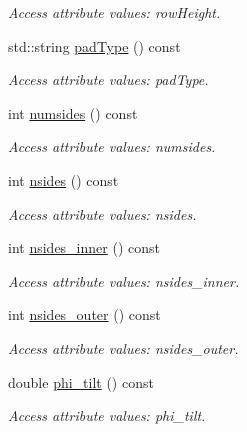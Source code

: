 \begin{DoxyCompactItemize}
\begin{DoxyCompactList}\small\item\em Access attribute values: rowHeight. \item\end{DoxyCompactList}\item 
std::string \hyperlink{struct_d_d4hep_1_1_x_m_l_1_1_dimension_ad410c2fa6dc3cd8edb60072a51bd3b38}{padType} () const 
\begin{DoxyCompactList}\small\item\em Access attribute values: padType. \item\end{DoxyCompactList}\item 
int \hyperlink{struct_d_d4hep_1_1_x_m_l_1_1_dimension_aad36bdbceb76c40112a9ae371d3405ad}{numsides} () const 
\begin{DoxyCompactList}\small\item\em Access attribute values: numsides. \item\end{DoxyCompactList}\item 
int \hyperlink{struct_d_d4hep_1_1_x_m_l_1_1_dimension_a2d8b7827cdd126398a07c81937f307e9}{nsides} () const 
\begin{DoxyCompactList}\small\item\em Access attribute values: nsides. \item\end{DoxyCompactList}\item 
int \hyperlink{struct_d_d4hep_1_1_x_m_l_1_1_dimension_aeef195971d2d39f221ad5e292e253fc4}{nsides\_\-inner} () const 
\begin{DoxyCompactList}\small\item\em Access attribute values: nsides\_\-inner. \item\end{DoxyCompactList}\item 
int \hyperlink{struct_d_d4hep_1_1_x_m_l_1_1_dimension_acac67e93cc9ffc70e29ab00bd1c23f5e}{nsides\_\-outer} () const 
\begin{DoxyCompactList}\small\item\em Access attribute values: nsides\_\-outer. \item\end{DoxyCompactList}\item 
double \hyperlink{struct_d_d4hep_1_1_x_m_l_1_1_dimension_a82569e3f303b1ae28a5ce00c3c7df624}{phi\_\-tilt} () const 
\begin{DoxyCompactList}\small\item\em Access attribute values: phi\_\-tilt. \item\end{DoxyCompactList}\item 

\end{DoxyCompactItemize}
